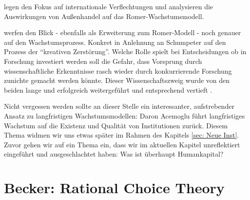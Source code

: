 \textcite{Grossman1991a, Grossman1991b} legen den Fokus auf internationale Verflechtungen und analysieren die Auswirkungen von Außenhandel auf das Romer-Wachstumsmodell.

\textcite{Aghion1992} werfen den Blick - ebenfalls als Erweiterung zum Romer-Modell - noch genauer auf den Wachstumsprozess. Konkret in Anlehnung an Schumpeter auf den Prozess der "`kreativen Zerstörung"'. Welche Rolle spielt bei Entscheidungen ob in Forschung investiert werden soll die Gefahr, dass Vorsprung durch wissenschaftliche Erkenntnisse rasch wieder durch konkurrierende Forschung zunichte gemacht werden könnte. Dieser Wissenschaftszweig wurde von den beiden lange und erfolgreich weitergeführt und entsprechend vertieft \parencite{Aghion2005}.

Nicht vergessen werden sollte an dieser Stelle ein interessanter, aufstrebender Ansatz zu langfristigen Wachstumsmodellen: Daron Acemoglu führt langfristiges Wachstum auf die Existenz und Qualität von Institutionen zurück. Diesem Thema widmen wir uns etwas später im Rahmen des Kapitels \ref{sec: Neue Inst}. Zuvor gehen wir auf ein Thema ein, dass wir im aktuellen Kapitel unreflektiert eingeführt und ausgeschlachtet haben: Was ist überhaupt Humankapital?

\section{Becker: Rational Choice Theory}  \label{sec: Becker}

